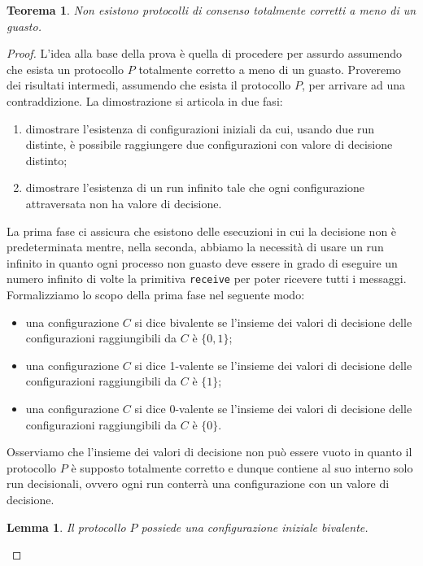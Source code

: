 \documentclass{article}
\newtheorem{lemma}{Lemma}
\newtheorem{teorema}{Teorema}
\begin{document}
\begin{teorema}
Non esistono protocolli di consenso totalmente corretti a meno di un guasto.
\end{teorema}

\begin{proof}
L'idea alla base della prova è quella di procedere per assurdo assumendo che esista un protocollo $P$ totalmente corretto a meno di un guasto. Proveremo dei risultati intermedi, assumendo che esista il protocollo $P$, per arrivare ad una contraddizione. La dimostrazione si articola in due fasi:
\begin{enumerate}
\item dimostrare l'esistenza di configurazioni iniziali da cui, usando due run distinte, è possibile raggiungere due configurazioni con valore di decisione distinto;
\item dimostrare l'esistenza di un run infinito tale che ogni configurazione attraversata non ha valore di decisione.
\end{enumerate}
La prima fase ci assicura che esistono delle esecuzioni in cui la decisione non è predeterminata mentre, nella seconda, abbiamo la necessità di usare un run infinito in quanto ogni processo non guasto deve essere in grado di eseguire un numero infinito di volte la primitiva \texttt{receive} per poter ricevere tutti i messaggi.\\
Formalizziamo lo scopo della prima fase nel seguente modo: 
\begin{itemize}
\item una configurazione $C$ si dice bivalente se l'insieme dei valori di decisione delle configurazioni raggiungibili da $C$ è $\{0,1\}$;
\item una configurazione $C$ si dice 1-valente se l'insieme dei valori di decisione delle configurazioni raggiungibili da $C$ è $\{1\}$;
\item una configurazione $C$ si dice 0-valente se l'insieme dei valori di decisione delle configurazioni raggiungibili da $C$ è $\{0\}$.
\end{itemize}

Osserviamo che l'insieme dei valori di decisione non può essere vuoto in quanto il protocollo $P$ è supposto totalmente corretto e dunque contiene al suo interno solo run decisionali, ovvero ogni run conterrà una configurazione con un valore di decisione.

\begin{lemma}
Il protocollo $P$ possiede una configurazione iniziale bivalente.
\end{lemma}


\end{proof}
\end{document}
